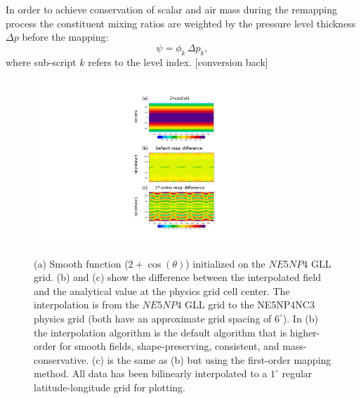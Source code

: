 \documentclass[twocol]{ametsoc}
\begin{document}
In order to achieve conservation of scalar and air mass during the remapping process the constituent mixing ratios are weighted by the pressure level thickness $\Delta p$ before the mapping:
\begin{equation}
\psi=\phi_k\, \Delta p_k,
\end{equation}
where sub-script $k$ refers to the level index. [conversion back]


\begin{figure}[t]
\noindent\includegraphics[width=19pc,angle=0]{figs/idealized-mapping-tests-smooth-field.pdf}\\
\caption{(a) Smooth function ($2+\cos(\theta)$) initialized on the $NE5NP4$ GLL grid. (b) and (c) show the difference between the interpolated field and the analytical value at the physics grid cell center. The interpolation is from the $NE5NP4$ GLL grid to the NE5NP4NC3 physics grid (both have an approximate grid spacing of $6^\circ$). In (b) the interpolation algorithm is the default algorithm that is higher-order for smooth fields, shape-preserving, consistent, and mass-conservative. (c) is the same as (b) but using the first-order mapping method. All data has been bilinearly interpolated to a $1^\circ$ regular latitude-longitude grid for plotting.}\label{fig:remap-smooth-field}
\end{figure}
\end{document}
